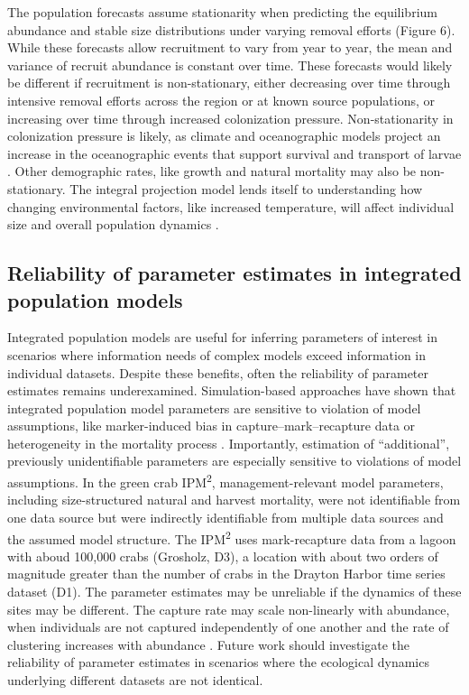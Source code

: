 \documentclass{article}
\begin{document}
The population forecasts assume stationarity when predicting the equilibrium abundance and stable size distributions under varying removal efforts (Figure 6). While these forecasts allow recruitment to vary from year to year, the mean and variance of recruit abundance is constant over time. These forecasts would likely be different if recruitment is non-stationary, either decreasing over time through intensive removal efforts across the region or at known source populations, or increasing over time through increased colonization pressure. Non-stationarity in colonization pressure is likely, as climate and oceanographic models project an increase in the oceanographic events that support survival and transport of larvae \parencite{du2024dispersal, cai2021changing}. Other demographic rates, like growth and natural mortality may also be non-stationary. The integral projection model lends itself to understanding how changing environmental factors, like increased temperature, will affect individual size and overall population dynamics \parencite{plard2019ipm, dahlgren2011incorporating}. 

\subsection{Reliability of parameter estimates in integrated population models}

Integrated population models are useful for inferring parameters of interest in scenarios where information needs of complex models exceed information in individual datasets. Despite these benefits, often the reliability of parameter estimates remains underexamined. Simulation-based approaches have shown that integrated population model parameters are sensitive to violation of model assumptions, like marker-induced bias in capture–mark–recapture data or heterogeneity in the mortality process \parencite{riecke2019integrated}. Importantly, estimation of “additional”, previously unidentifiable parameters are especially sensitive to violations of model assumptions. In the green crab IPM\textsuperscript{2}, management-relevant model parameters, including size-structured natural and harvest mortality, were not identifiable from one data source but were indirectly identifiable from multiple data sources and the assumed model structure. The IPM\textsuperscript{2} uses mark-recapture data from a lagoon with  aboud 100,000 crabs (Grosholz, D3), a location with about two orders of magnitude greater than the number of crabs in the Drayton Harbor time series dataset (D1). The parameter estimates may be unreliable if the dynamics of these sites may be different. The capture rate may scale non-linearly with abundance, when individuals are not captured independently of one another and the rate of clustering increases with abundance \parencite{mccarthy2013influence}. Future work should investigate the reliability of parameter estimates in scenarios where the ecological dynamics underlying different datasets are not identical. 
\end{document}
